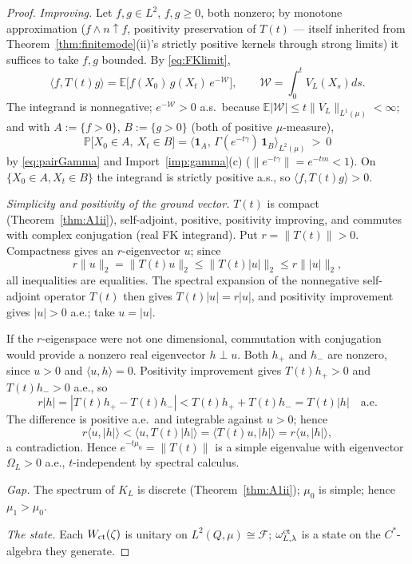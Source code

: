 \documentclass[11pt,a4paper]{article}
\theoremstyle{plain}
\theoremstyle{definition}
\newcommand{\E}{\mathbb{E}}
\newcommand{\PP}{\mathbb{P}}
\newcommand{\ip}[2]{\langle #1,#2\rangle}
\newcommand{\muv}{\mu}
\newcommand{\Gam}{\Gamma}
\begin{document}
\begin{proof}
\emph{Improving.} Let $f,g\in L^2$, $f,g\ge0$, both nonzero; by
monotone approximation ($f\wedge n\uparrow f$, positivity preservation
of $T(t)$ --- itself inherited from
Theorem~\ref{thm:finitemode}(ii)'s strictly positive kernels through
strong limits) it suffices to take $f,g$ bounded. By
\eqref{eq:FKlimit},
\[
 \ip{f}{T(t)g}=\E\bigl[f(X_0)\,g(X_t)\,e^{-\mathcal W}\bigr],
 \qquad \mathcal W=\int_0^tV_L(X_s)ds .
\]
The integrand is nonnegative; $e^{-\mathcal W}>0$ a.s.\ because
$\E|\mathcal W|\le t\|V_L\|_{L^1(\muv)}<\infty$; and with
$A:=\{f>0\}$, $B:=\{g>0\}$ (both of positive $\muv$-measure),
\[
 \PP\bigl[X_0\in A,\ X_t\in B\bigr]
 =\ip{\mathbf 1_A}{\,\Gam(e^{-t\gamma})\,\mathbf 1_B}_{L^2(\muv)}
 \ >\ 0
\]
by \eqref{eq:pairGamma} and Import~\ref{imp:gamma}(c)
($\|e^{-t\gamma}\|=e^{-tm}<1$). On $\{X_0\in A,X_t\in B\}$ the integrand
is strictly positive a.s., so $\ip f{T(t)g}>0$.

\emph{Simplicity and positivity of the ground vector.} $T(t)$ is
compact (Theorem~\ref{thm:A1ii}), self-adjoint, positive, positivity
improving, and commutes with complex conjugation (real FK integrand).
Put $r=\|T(t)\|>0$.  Compactness gives an $r$-eigenvector $u$; since
\[
 r\|u\|_2=\|T(t)u\|_2\le\|T(t)|u|\|_2\le r\||u|\|_2,
\]
all inequalities are equalities.  The spectral expansion of the nonnegative
self-adjoint operator $T(t)$ then gives $T(t)|u|=r|u|$, and positivity
improvement gives $|u|>0$ a.e.; take $u=|u|$.

If the $r$-eigenspace were not one dimensional, commutation with conjugation
would provide a nonzero real eigenvector $h\perp u$.  Both $h_+$ and $h_-$
are nonzero, since $u>0$ and $\langle u,h\rangle=0$.  Positivity improvement
gives $T(t)h_+>0$ and $T(t)h_->0$ a.e., so
\[
 r|h|=|T(t)h_+-T(t)h_-|<T(t)h_++T(t)h_-=T(t)|h|
 \quad\text{a.e.}
\]
The difference is positive a.e.\ and integrable against $u>0$; hence
\[
 r\langle u,|h|\rangle
 <\langle u,T(t)|h|\rangle
 =\langle T(t)u,|h|\rangle
 =r\langle u,|h|\rangle,
\]
a contradiction. Hence
$e^{-t\mu_0}=\|T(t)\|$ is a simple eigenvalue with eigenvector
$\Omega_L>0$ a.e., $t$-independent by spectral calculus.

\emph{Gap.} The spectrum of $K_L$ is discrete
(Theorem~\ref{thm:A1ii}); $\mu_0$ is simple; hence
$\mu_1>\mu_0$.

\emph{The state.} Each $W_{\rm ct}(\zeta)$ is unitary on
$L^2(Q,\muv)\cong\mathcal F$; $\omega^{\rm ct}_{L,\lambda}$ is a state
on the $C^*$-algebra they generate.
\end{proof}
\end{document}
